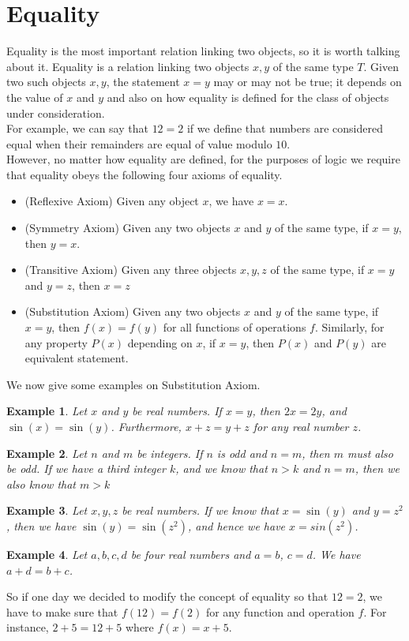 \documentclass[a4paper]{book}
\theoremstyle{break}
\newtheorem{example}{Example}[section]
\begin{document}
		\section{Equality}
			Equality is the most important relation linking two objects, so it is worth talking about it. Equality is a relation linking two objects $x,y$ of the same type $T$. Given two such objects $x,y$, the statement $x=y$ may or may not be true; it depends on the value of $x$ and $y$ and also on how equality is defined for the class of objects under consideration.\\
			For example, we can say that $12=2$ if we define that numbers are considered equal when their remainders are equal of value modulo $10$.\\
			However, no matter how equality are defined, for the purposes of logic we require that equality obeys the following four axioms of equality.
			\begin{itemize}
				\item (Reflexive Axiom) Given any object $x$, we have $x=x$.
				\item (Symmetry Axiom) Given any two objects $x$ and $y$ of the same type, if $x=y$, then $y=x$.
				\item (Transitive Axiom) Given any three objects $x,y,z$ of the same type, if $x=y$ and $y=z$, then $x=z$
				\item (Substitution Axiom) Given any two objects $x$ and $y$ of the same type, if $x=y$, then $f(x)=f(y)$ for all functions of operations $f$. Similarly, for any property $P(x)$ depending on $x$, if $x=y$, then $P(x)$ and $P(y)$ are equivalent statement.
			\end{itemize}
			We now give some examples on Substitution Axiom.
			\begin{example}
				Let $x$ and $y$ be real numbers. If $x=y$, then $2x=2y$, and $\sin(x)=\sin(y)$. Furthermore, $x+z=y+z$ for any real number $z$.
			\end{example}
			\begin{example}
				Let $n$ and $m$ be integers. If $n$ is odd and $n=m$, then $m$ must also be odd. If we have a third integer $k$, and we know that $n>k$ and $n=m$, then we also know that $m>k$
			\end{example}
			\begin{example}
				Let $x,y,z$ be real numbers. If we know that $x=\sin(y)$ and $y=z^2$, then we have $\sin(y)=\sin(z^2)$, and hence we have $x=sin(z^2)$.
			\end{example}
			\begin{example}
				Let $a,b,c,d$ be four real numbers and $a=b$, $c=d$. We have $a+d=b+c$.
			\end{example}
			So if one day we decided to modify the concept of equality so that $12=2$, we have to make sure that $f(12)=f(2)$ for any function and operation $f$. For instance, $2+5=12+5$ where $f(x)=x+5$.
\end{document}

